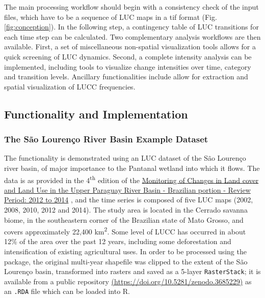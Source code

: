The main processing workflow should begin with a consistency check of
the input files, which have to be a sequence of LUC maps in a tif format
(Fig. \ref{fig:conception}). In the following step, a contingency table
of LUC transitions for each time step can be calculated. Two
complementary analysis workflows are then available. First, a set of
miscellaneous non-spatial visualization tools allows for a quick
screening of LUC dynamics. Second, a complete intensity analysis
\citep{Aldwaik2012, Aldwaik2013} can be implemented, including tools to
visualize change intensities over time, category and transition levels.
Ancillary functionalities include allow for extraction and spatial
visualization of LUCC frequencies.

\hypertarget{functionality-and-implementation}{%
\subsection{Functionality and
Implementation}\label{functionality-and-implementation}}

\hypertarget{the-suxe3o-lourenuxe7o-river-basin-example-dataset}{%
\subsubsection{The São Lourenço River Basin Example
Dataset}\label{the-suxe3o-lourenuxe7o-river-basin-example-dataset}}

The  functionality is demonstrated using an LUC dataset of the
São Lourenço river basin, of major importance to the Pantanal wetland
into which it flows. The data is as provided in the
4\textsuperscript{th} edition of the
\href{https://www.embrapa.br/pantanal/bacia-do-alto-paraguai}{Monitoring
of Changes in Land cover and Land Use in the Upper Paraguay River Basin
- Brazilian portion - Review Period: 2012 to 2014}
\citep{Embrapapantanalsite2015}, and the time series is composed of five
LUC maps (2002, 2008, 2010, 2012 and 2014). The study area is located in
the Cerrado savanna biome, in the southeastern corner of the Brazilian
state of Mato Grosso, and covers approximately 22,400
km\textsuperscript{2}. Some level of LUCC has occurred in about 12\% of
the area over the past 12 years, including some deforestation and
intensification of existing agricultural uses. In order to be processed
using the  package, the original multi-year shapefile was
clipped to the extent of the São Lourenço basin, transformed into
rasters and saved as a 5-layer \texttt{RasterStack}; it is available
from a public repository
\href{https://zenodo.org/record/3685230\#.Xl7cDMgReUk}{(https://doi.org/10.5281/zenodo.3685229)}
as an \texttt{.RDA} file which can be loaded into R.

